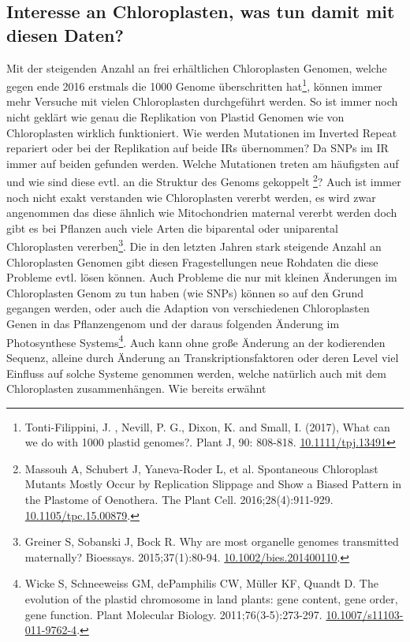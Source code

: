 \documentclass{scrartcl}
\begin{document}
\subsection{Interesse an Chloroplasten, was tun damit mit diesen Daten?}
\label{sec-1-6}
Mit der steigenden Anzahl an frei erhältlichen Chloroplasten Genomen, welche gegen ende 2016 erstmals die 1000 Genome überschritten hat\footnote{Tonti-Filippini, J. , Nevill, P. G., Dixon, K. and Small, I. (2017), What can we do with 1000 plastid genomes?. Plant J, 90: 808-818. \url{10.1111/tpj.13491}}, können immer mehr Versuche mit vielen Chloroplasten durchgeführt werden.
So ist immer noch nicht geklärt wie genau die Replikation von Plastid Genomen wie von Chloroplasten wirklich funktioniert. Wie werden Mutationen im Inverted Repeat repariert oder bei der Replikation auf beide IRs übernommen?
Da SNPs im IR immer auf beiden gefunden werden. Welche Mutationen treten am häufigsten auf und wie sind diese evtl. an die Struktur des Genoms gekoppelt \footnote{Massouh A, Schubert J, Yaneva-Roder L, et al. Spontaneous Chloroplast Mutants Mostly Occur by Replication Slippage and Show a Biased Pattern in the Plastome of Oenothera. The Plant Cell. 2016;28(4):911-929. \url{10.1105/tpc.15.00879}.}? Auch ist immer noch nicht exakt verstanden wie Chloroplasten
vererbt werden, es wird zwar angenommen das diese ähnlich wie Mitochondrien maternal vererbt werden doch gibt es bei Pflanzen auch viele Arten die biparental oder uniparental Chloroplasten vererben\footnote{Greiner S, Sobanski J, Bock R. Why are most organelle genomes transmitted maternally? Bioessays. 2015;37(1):80-94. \url{10.1002/bies.201400110}.}. Die in den letzten 
Jahren stark steigende Anzahl an Chloroplasten Genomen gibt diesen Fragestellungen neue Rohdaten die diese Probleme evtl. lösen können. Auch Probleme die nur mit kleinen Änderungen im Chloroplasten Genom zu tun haben (wie SNPs)
können so auf den Grund gegangen werden, oder auch die Adaption von verschiedenen Chloroplasten Genen in das Pflanzengenom und der daraus folgenden Änderung im Photosynthese Systems\footnote{Wicke S, Schneeweiss GM, dePamphilis CW, Müller KF, Quandt D. The evolution of the plastid chromosome in land plants: gene content, gene order, gene function. Plant Molecular Biology. 2011;76(3-5):273-297. \url{10.1007/s11103-011-9762-4}.}. Auch kann ohne große Änderung an der
kodierenden Sequenz, alleine durch Änderung an Transkriptionsfaktoren oder deren Level viel Einfluss auf solche Systeme genommen werden, welche natürlich auch mit dem Chloroplasten zusammenhängen. Wie bereits erwähnt 
\end{document}
